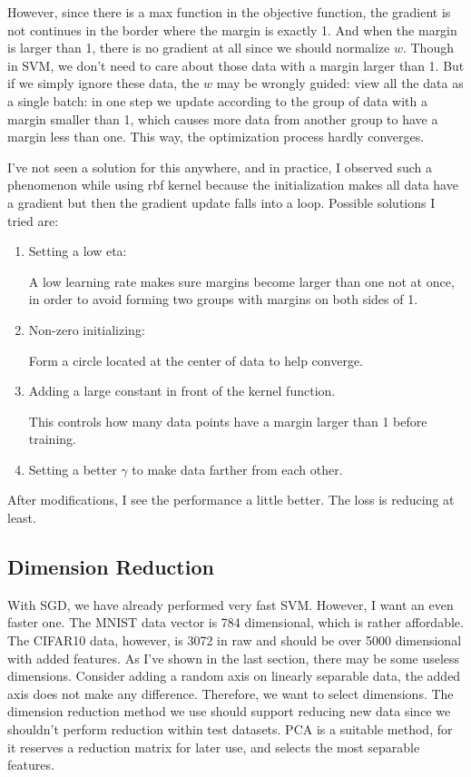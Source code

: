 \documentclass[conference]{IEEEtran}
\begin{document}
	However, since there is a max function in the objective function, the gradient is not continues in the border where the margin is exactly 1. And when the margin is larger than 1, there is no gradient at all since we should normalize $w$. Though in SVM, we don't need to care about those data with a margin larger than 1. But if we simply ignore these data, the $w$ may be wrongly guided: view all the data as a single batch: in one step we update according to the group of data with a margin smaller than 1, which causes more data from another group to have a margin less than one. This way, the optimization process hardly converges. 
	
	I've not seen a solution for this anywhere, and in practice, I observed such a phenomenon while using rbf kernel because the initialization makes all data have a gradient but then the gradient update falls into a loop. Possible solutions I tried are: 
	\begin{enumerate}
		\item Setting a low eta:
		
		A low learning rate makes sure margins become larger than one not at once, in order to avoid forming two groups with margins on both sides of 1.
		\item Non-zero initializing:
		
		Form a circle located at the center of data to help converge. 
		
		\item Adding a large constant in front of the kernel function.
		
		This controls how many data points have a margin larger than 1 before training. 
		
		\item Setting a better $\gamma$ to make data farther from each other.
	\end{enumerate}
	After modifications, I see the performance a little better. The loss is reducing at least. 
	\subsection{Dimension Reduction}
	With SGD, we have already performed very fast SVM. However, I want an even faster one. The MNIST data vector is 784 dimensional, which is rather affordable. The CIFAR10 data, however, is 3072 in raw and should be over 5000 dimensional with added features. As I've shown in the last section, there may be some useless dimensions. Consider adding a random axis on linearly separable data, the added axis does not make any difference. Therefore, we want to select dimensions. The dimension reduction method we use should support reducing new data since we shouldn't perform reduction within test datasets. PCA is a suitable method, for it reserves a reduction matrix for later use, and selects the most separable features. 
\end{document}
